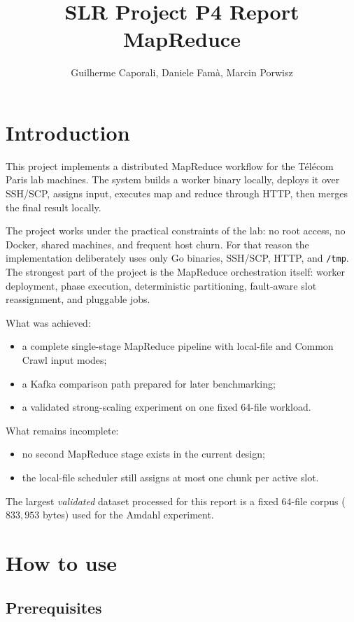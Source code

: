 \documentclass[11pt,a4paper]{article}
\title{\textbf{SLR Project P4 Report}\\MapReduce}
\author{Guilherme Caporali, Daniele Famà, Marcin Porwisz}
\date{}
\begin{document}
\maketitle

\section{Introduction}

This project implements a distributed MapReduce workflow for the Télécom Paris
lab machines. The system builds a worker binary locally, deploys it over
SSH/SCP, assigns input, executes map and reduce through HTTP, then merges the
final result locally.

The project works under the practical constraints of the lab: no root access,
no Docker, shared machines, and frequent host churn. For that reason the
implementation deliberately uses only Go binaries, SSH/SCP, HTTP, and
\texttt{/tmp}. The strongest part of the project is the MapReduce orchestration
itself: worker deployment, phase execution, deterministic partitioning,
fault-aware slot reassignment, and pluggable jobs.

What was achieved:
\begin{itemize}[leftmargin=1.5em]
  \item a complete single-stage MapReduce pipeline with local-file and Common
  Crawl input modes;
  \item a Kafka comparison path prepared for later benchmarking;
  \item a validated strong-scaling experiment on one fixed 64-file workload.
\end{itemize}

What remains incomplete:
\begin{itemize}[leftmargin=1.5em]
  \item no second MapReduce stage exists in the current design;
  \item the local-file scheduler still assigns at most one chunk per active slot.
\end{itemize}

The largest \emph{validated} dataset processed for this report is a fixed
64-file corpus (\(833{,}953\) bytes) used for the Amdahl experiment.

\section{How to use}

\subsection{Prerequisites}
\end{document}
